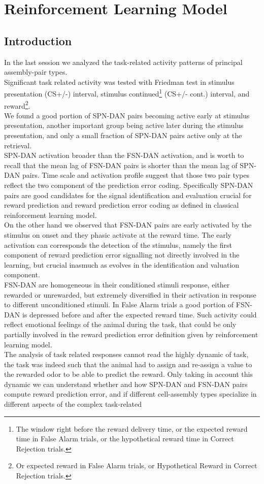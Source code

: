 \chapter{Reinforcement Learning Model}
\label{chap:RLModel}
\section{Introduction}
\label{sec:IntroRL}
In the last session we analyzed the task-related activity patterns of principal assembly-pair types.\\Significant task related activity was tested with Friedman test in stimulus presentation (CS+/-) interval, stimulus continued\footnote{The window right before the reward delivery time, or the expected reward time in False Alarm trials, or the hypothetical reward time in Correct Rejection trials.} (CS+/- cont.) interval, and reward\footnote{Or expected reward in False Alarm trials, or Hypothetical Reward in Correct Rejection trials.}.\\We found a good portion of SPN-DAN pairs becoming active early at stimulus presentation, another important group being active later during the stimulus presentation, and only a small fraction of SPN-DAN pairs active only at the retrieval.\\SPN-DAN activation broader than the FSN-DAN activation, and is worth to recall that the mean lag of FSN-DAN pairs is shorter than the mean lag of SPN-DAN pairs. Time scale and activation profile suggest that those two pair types reflect the two component of the prediction error coding. Specifically SPN-DAN pairs are good candidates for the signal identification and evaluation crucial for reward prediction and reward prediction error coding as defined in classical reinforcement learning model.\\On the other hand we observed that FSN-DAN pairs are early activated by the stimulus on onset and they phasic activate at the reward time. The early activation can corresponds the detection of the stimulus, namely the first component of reward prediction error signalling not directly involved in the learning, but crucial inasmuch as evolves in the identification and valuation component.\\FSN-DAN are homogeneous in their conditioned stimuli response, either rewarded or unrewarded, but extremely diversified in their activation in response to different unconditioned stimuli. In False Alarm trials a good portion of FSN-DAN is depressed before and after the expected reward time. Such activity could reflect emotional feelings of the animal during the task, that could be only partially involved in the reward prediction error definition given by reinforcement learning model.\\The analysis of task related responses cannot read the highly dynamic of task, the task was indeed such that the animal had to assign and re-assign a value to the rewarded odor to be able to predict the reward. Only taking in account this dynamic we can understand whether and how SPN-DAN and FSN-DAN pairs compute reward prediction error, and if different cell-assembly types specialize in different aspects of the complex task-related 